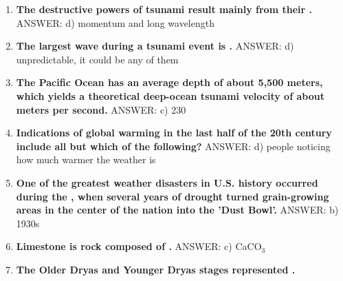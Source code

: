 \documentclass[10pt]{article}
\newcommand{\Rivpt}{\rule{.1pt}{1pt}}
\begin{document}
\begin{enumerate}
\item {
\setlength{\itemsep}{0cm}
\setlength{\parskip}{.2cm}
\begin{samepage}
\textbf{
The destructive powers of tsunami result mainly from their \makebox[1cm]{\Rivpt\hrulefill\Rivpt}.
}
ANSWER: d)	momentum and long wavelength
\end{samepage}
}
\item {
\setlength{\itemsep}{0cm}
\setlength{\parskip}{.2cm}
\begin{samepage}
\textbf{
The largest wave during a tsunami event is \makebox[1cm]{\Rivpt\hrulefill\Rivpt}.
}
ANSWER: d)	unpredictable, it could be any of them
\end{samepage}
}
\item {
\setlength{\itemsep}{0cm}
\setlength{\parskip}{.2cm}
\begin{samepage}
\textbf{
The Pacific Ocean has an average depth of about 5,500 meters, which yields a theoretical deep-ocean tsunami velocity of about \makebox[1cm]{\Rivpt\hrulefill\Rivpt} meters per second.
}
ANSWER: c)	230
\end{samepage}
}
\item {
\setlength{\itemsep}{0cm}
\setlength{\parskip}{.2cm}
\begin{samepage}
\textbf{
Indications of global warming in the last half of the 20th century include all but which of the following?
}
ANSWER: d) people noticing how much warmer the weather is
\end{samepage}
}
\item {
\setlength{\itemsep}{0cm}
\setlength{\parskip}{.2cm}
\begin{samepage}
\textbf{
One of the greatest weather disasters in U.S. history occurred during the \makebox[1cm]{\Rivpt\hrulefill\Rivpt}, when several years of drought turned grain-growing areas in the center of the nation into the 'Dust Bowl'. 
}
ANSWER: b) 1930s
\end{samepage}
}
\item {
\setlength{\itemsep}{0cm}
\setlength{\parskip}{.2cm}
\begin{samepage}
\textbf{
Limestone is rock composed of \makebox[1cm]{\Rivpt\hrulefill\Rivpt}. 
}
ANSWER: c) CaCO\ensuremath{_3}
\end{samepage}
}
\item {
\setlength{\itemsep}{0cm}
\setlength{\parskip}{.2cm}
\begin{samepage}
\textbf{
The Older Dryas and Younger Dryas stages represented \makebox[1cm]{\Rivpt\hrulefill\Rivpt}.
}
\end{samepage}}
\end{enumerate}
\end{document}
